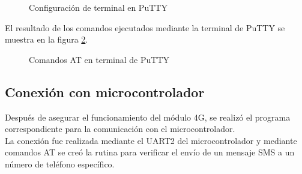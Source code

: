 	\begin{figure}[htbp!]
		\centering
		\caption{Configuración de terminal en PuTTY}
		\label{fig:ConfiguracionPutty}
	\end{figure}
 
El resultado de los comandos ejecutados mediante la terminal de PuTTY se muestra en la figura \ref{fig:TerminalPutty}.

	\begin{figure}[htbp!]
		\centering
		\caption{Comandos AT en terminal de PuTTY}
		\label{fig:TerminalPutty}
	\end{figure}


\subsection{Conexión con microcontrolador}
Después de asegurar el funcionamiento del módulo 4G, se realizó el programa correspondiente para la comunicación con el microcontrolador.\\

La conexión fue realizada mediante el UART2 del microcontrolador y mediante comandos AT se creó la rutina para verificar el envío de un mensaje SMS a un número de teléfono específico.

